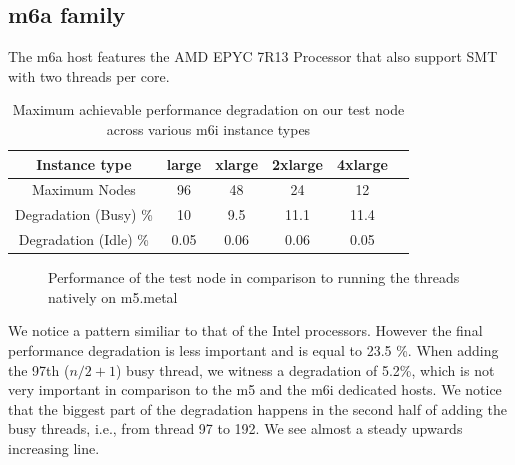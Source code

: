 \subsection{m6a family}
The m6a host features the AMD EPYC 7R13 Processor that also support \ac{SMT} with two threads per core.

\begin{table}[H]
\begin{center}
\begin{tabular}{ |c|c|c|c|c|c }
 Instance type & large & xlarge & 2xlarge & 4xlarge \\
 \hline
 Maximum Nodes & 96 & 48 & 24 & 12  \\
 \hline
Degradation (Busy) \% & 10 & 9.5 & 11.1 & 11.4  \\ 
\hline 
Degradation (Idle) \% & 0.05 & 0.06 & 0.06 & 0.05  \\ 
\end{tabular}
\end{center}
\caption{Maximum achievable performance degradation on our test node across various m6i instance types}
\label{tab::max_m6a}
\end{table}


\begin{figure}[H]
\caption{Performance of the test node in comparison to running the threads natively on m5.metal}
\label{fig::m6a_metal_vs_VMs}
\end{figure}
\noindent
We notice a pattern similiar to that of the Intel processors. However the final performance degradation is 
less important and is equal to 23.5 \%. When adding the 97th ($n/2 + 1$) busy thread, we witness a degradation 
of 5.2\%, which is not very important in comparison to the m5 and the m6i dedicated hosts. 
We notice that the biggest part of the degradation happens in the second half of adding the 
busy threads, i.e., from thread 97 to 192. We see almost a steady upwards increasing line. 

